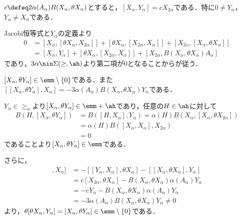 \begin{lem}\label{lem:3.2}
  $c \defeq 2\alpha(A_{\alpha})B(X_{\alpha},\theta X_{\alpha}) $とすると，$[X_{\alpha}, Y_{\alpha}] = cX_{2\alpha} $である．特に$0\neq Y_{\alpha}$，$Y_{\alpha} \neq X_{\alpha} $である．
\end{lem}
\begin{npfwn}
  Jacobi恒等式と$Y_{\alpha}$の定義より
  \begin{align*}
    0 &= [X_{\alpha},[\theta X_{\alpha}, X_{2\alpha}]] + [\theta X_{\alpha},[X_{2\alpha}, X_{\alpha}]] + [X_{2\alpha},[X_{\alpha}, \theta X_{\alpha}]] \\
      &= [X_{\alpha}, Y_{\alpha}] + [\theta X_{\alpha},[X_{2\alpha}, X_{\alpha}]]  + [X_{2\alpha},B(X_{\alpha},\theta X_{\alpha})A_{\alpha}]
  \end{align*}
  であり，$3\alpha\nin \Sigma(\ge,\ah) $より第二項が0となることからが従う．
\end{npfwn}

\begin{lem}\label{lem:3.3}
  $[X_{\alpha},\theta Y_{\alpha}]\in \emm\setminus\{0\} $である．また$[[X_{\alpha}, \theta Y_{\alpha}], X_{\alpha}] = -3\alpha(A_{\alpha})B(X_{\alpha}, \theta X_{\alpha})Y_{\alpha} $である．
\end{lem}

\begin{npfwn}
  $Y_{\alpha} \in \ge_{\alpha} $より$[X_{\alpha},\theta Y_{\alpha}]\in \emm+ \ah$であり，任意の$H\in \ah$に対して
  \begin{align*}
    B(H, [X_{\alpha},\theta Y_{\alpha}]) &= B([H, X_{\alpha}], Y_{\alpha}) = \alpha(H) B(X_{\alpha}, [X_{\alpha}, \theta X_{2\alpha}]) \\
                                         &= \alpha(H)B([X_{\alpha}, X_{\alpha}], X_{2\alpha}) \\
                                         &= 0
  \end{align*}
  であることより$[X_{\alpha},\theta Y_{\alpha}]\in \emm$である．

  さらに，
  \begin{align*}
    [[\theta X_{\alpha},Y_{\alpha}], X_{\alpha}] &= -[[Y_{\alpha}, X_{\alpha}], \theta X_{\alpha}] - [[X_{\alpha}, \theta X_{\alpha}], Y_{\alpha}]\\
                                                 &= c[X_{2\alpha}, \theta X_{\alpha}] -  B(X_{\alpha},\theta X_{\alpha})\alpha(A_{\alpha})Y_{\alpha}\\
                                                 &= -cY_{\alpha}-  B(X_{\alpha},\theta X_{\alpha})\alpha(A_{\alpha})Y_{\alpha} \\
                                                 &= -3\alpha(A_{\alpha})B(X_{\alpha}, \theta X_{\alpha})Y_{\alpha} \neq 0
  \end{align*}
  より，$\theta [\theta X_{\alpha},Y_{\alpha}] = [X_{\alpha},\theta Y_{\alpha}]\in \emm\setminus\{0\} $である．
\end{npfwn}

